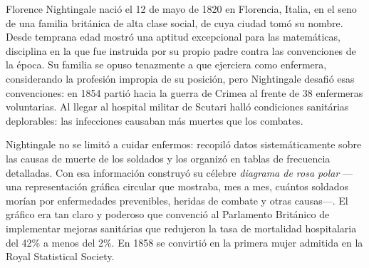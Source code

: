 \documentclass[11pt, letterpaper]{article}
\begin{document}
\begin{tcolorbox}[enhanced, breakable,
  colback=white, colframe=blockb, colbacktitle=blockb,
  coltitle=white, arc=4pt, leftrule=5pt,
  left=10pt, right=10pt, top=12pt, bottom=10pt,
  fonttitle=\bfseries,
  attach boxed title to top left={xshift=0.5cm, yshift*=-\tcboxedtitleheight/2},
  boxed title style={colframe=blockb, colback=blockb, arc=2pt},
  title={Florence Nightingale \hfill \normalfont\itshape 1820 --- 1910}]

\begin{minipage}[t]{0.18\linewidth}
\vspace{0pt}
\end{minipage}
\hfill
\begin{minipage}[t]{0.78\linewidth}
\vspace{0pt}

Florence Nightingale naci\'o el 12 de mayo de 1820 en Florencia, Italia, en el seno de una familia brit\'anica de alta clase social, de cuya ciudad tom\'o su nombre. Desde temprana edad mostr\'o una aptitud excepcional para las matem\'aticas, disciplina en la que fue instruida por su propio padre contra las convenciones de la \'epoca. Su familia se opuso tenazmente a que ejerciera como enfermera, considerando la profesi\'on impropia de su posici\'on, pero Nightingale desafi\'o esas convenciones: en 1854 parti\'o hacia la guerra de Crimea al frente de 38 enfermeras voluntarias. Al llegar al hospital militar de Scutari hall\'o condiciones sanit\'arias deplorables: las infecciones causaban m\'as muertes que los combates.

\medskip
Nightingale no se limit\'o a cuidar enfermos: recopil\'o datos sistem\'aticamente sobre las causas de muerte de los soldados y los organiz\'o en tablas de frecuencia detalladas. Con esa informaci\'on construy\'o su c\'elebre \textit{diagrama de rosa polar} ---una representaci\'on gr\'afica circular que mostraba, mes a mes, cu\'antos soldados mor\'ian por enfermedades prevenibles, heridas de combate y otras causas---. El gr\'afico era tan claro y poderoso que convenci\'o al Parlamento Brit\'anico de implementar mejoras sanit\'arias que redujeron la tasa de mortalidad hospitalaria del 42\% a menos del 2\%. En 1858 se convirti\'o en la primera mujer admitida en la Royal Statistical Society.


\end{minipage}
\end{tcolorbox}
\end{document}
